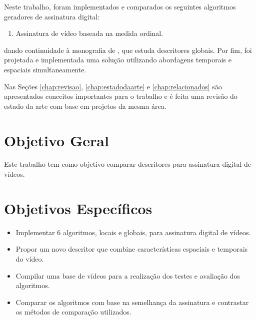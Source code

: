 Neste trabalho, foram implementados e comparados os seguintes algoritmos geradores de assinatura digital: 
\begin{enumerate}
\item Assinatura de vídeo baseada na medida ordinal.
\end{enumerate}
    
dando continuidade à monografia de \citeauthor{sylvio2015}, que estuda descritores globais. Por fim, foi projetada e implementada uma solução utilizando abordagens temporais e espaciais simultaneamente.
    

Nas Seções \ref{chap:revisao}, \ref{chap:estadodaarte} e \ref{chap:relacionados} são apresentados conceitos importantes para o trabalho e é feita uma revisão do estado da arte com base em projetos da mesma área.


\section{Objetivo Geral}
Este trabalho tem como objetivo comparar descritores para assinatura digital de vídeos.

\section{Objetivos Específicos}
\begin{itemize}
\item Implementar 6 algoritmos, locais e globais, para assinatura digital de vídeos.
\item Propor um novo descritor que combine características espaciais e temporais do vídeo.
\item Compilar uma base de vídeos para a realização dos testes e avaliação dos algoritmos.
\item Comparar os algoritmos com base na semelhança da assinatura e contrastar os métodos de comparação utilizados.
\end{itemize}

